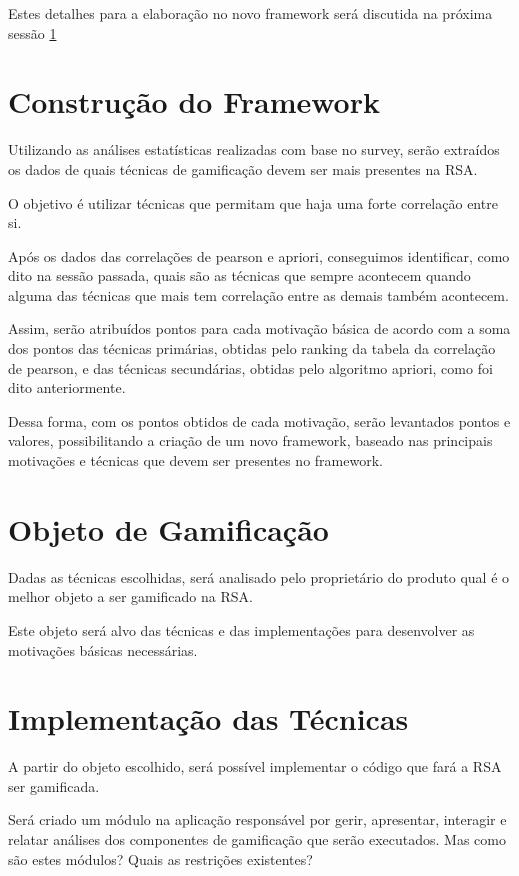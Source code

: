 Estes detalhes para a elaboração no novo framework será discutida na próxima sessão \ref{sub:constru_o_do_framework}

\section{Construção do Framework}
\label{sub:constru_o_do_framework}
Utilizando as análises estatísticas realizadas com base no survey, serão extraídos os dados de quais técnicas de gamificação
devem ser mais presentes na RSA.

O objetivo é  utilizar técnicas que permitam que haja uma forte correlação entre si.

Após os dados das correlações de pearson e apriori, conseguimos identificar, como dito na sessão passada, quais são as técnicas
que sempre acontecem quando alguma das técnicas que mais tem correlação entre as demais também acontecem.

Assim, serão atribuídos pontos para cada motivação básica de acordo com a soma dos pontos das técnicas primárias, obtidas pelo ranking da
tabela da correlação de pearson, e das técnicas secundárias, obtidas pelo algoritmo apriori, como foi dito anteriormente.

Dessa forma, com os pontos obtidos de cada motivação, serão levantados pontos e valores, possibilitando a criação de um novo framework,
baseado nas principais motivações e técnicas que devem ser presentes no framework.

\section{Objeto de Gamificação}
\label{sub:objeto_de_gamifica_o}
Dadas as técnicas escolhidas, será analisado pelo proprietário do produto qual é o melhor objeto a ser gamificado na RSA.

Este objeto será alvo das técnicas e das implementações para desenvolver as motivações básicas necessárias.


\section{Implementação das Técnicas}
\label{sub:implementa_o_das_t_cnicas}
A partir do objeto escolhido, será possível implementar o código que fará a RSA ser gamificada.

Será criado um módulo na aplicação responsável por gerir, apresentar, interagir e relatar análises
dos componentes de gamificação que serão executados. Mas como são estes módulos? Quais as restrições existentes?

